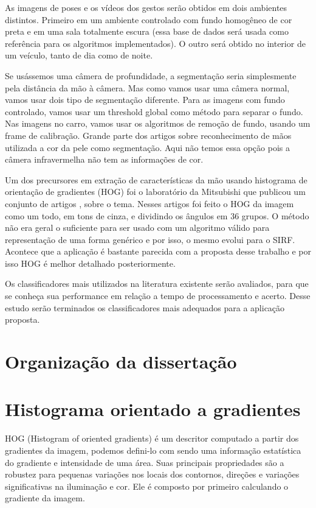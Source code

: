As imagens de poses e os vídeos dos gestos serão obtidos em  dois ambientes distintos. Primeiro em um ambiente controlado com fundo homogêneo de cor preta e em uma sala totalmente escura (essa base de dados será usada como referência para os algoritmos implementados). O outro será obtido no interior de um veículo, tanto de dia como de noite.

Se usássemos uma câmera de profundidade, a segmentação seria simplesmente pela distância da mão à câmera. Mas como vamos usar uma câmera normal, vamos usar dois tipo de segmentação diferente. 
Para as imagens com fundo controlado, vamos usar um threshold global como método para separar o fundo. Nas imagens no carro, vamos usar os algoritmos de remoção de fundo, usando um frame de calibração.
Grande parte dos artigos sobre reconhecimento de mãos utilizada a cor da pele como segmentação. Aqui não temos essa opção pois a câmera infravermelha não tem as informações de cor.

Um dos precursores em extração de características da mão usando histograma de orientação de gradientes (HOG) foi o laboratório da Mitsubishi que publicou um conjunto de artigos \cite{ref3}, \cite{ref4} sobre o tema. Nesses artigos foi feito o HOG da imagem como um todo, em tons de cinza, e dividindo os ângulos em 36 grupos. O método não era geral o suficiente para ser usado com um algoritmo válido para representação de uma forma genérico e por isso, o mesmo evolui para o SIRF. Acontece que a aplicação é bastante parecida com a proposta desse trabalho e por isso HOG é melhor detalhado posteriormente.

Os classificadores mais utilizados na literatura existente serão avaliados, para que se conheça sua performance em relação a tempo de processamento e acerto. Desse estudo serão terminados os classificadores mais adequados para a aplicação proposta.

\section{Organização da dissertação}


\section{Histograma orientado a gradientes}

HOG (Histogram of oriented gradients) é um descritor computado a partir dos gradientes da imagem, podemos defini-lo com sendo uma informação estatística do gradiente e intensidade de uma área. Suas principais propriedades são a robustez para pequenas variações nos locais dos contornos, direções e variações significativas na iluminação e cor.
Ele é composto por primeiro calculando o gradiente da imagem. 

